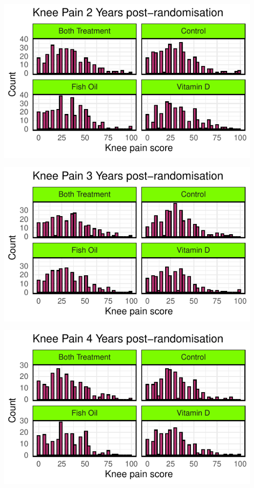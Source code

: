 \documentclass{article}
\newcommand{\pandocbounded}[1]{#1}
\begin{document}
\pandocbounded{\includegraphics[keepaspectratio]{Final_Report_files/figure-latex/unnamed-chunk-19-1.pdf}}

\pandocbounded{\includegraphics[keepaspectratio]{Final_Report_files/figure-latex/unnamed-chunk-20-1.pdf}}

\pandocbounded{\includegraphics[keepaspectratio]{Final_Report_files/figure-latex/unnamed-chunk-21-1.pdf}}
\end{document}
